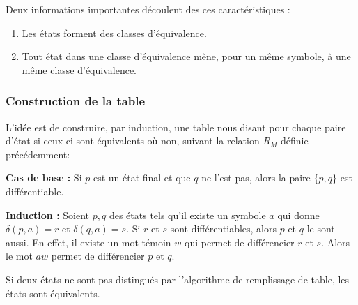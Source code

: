 Deux informations importantes découlent des ces caractéristiques : 
\begin{enumerate}
	\item Les états forment des classes d'équivalence.
	\item Tout état dans une classe d'équivalence mène, pour un même symbole, à une même classe d'équivalence.
\end{enumerate}

\subsubsection{Construction de la table}

L'idée est de construire, par induction, une table nous disant pour chaque paire d'état si ceux-ci sont équivalents où non, suivant la relation $R_M$ définie précédemment:

\textbf{Cas de base :} Si $p$ est un état final et que $q$ ne l'est pas, alors la paire $\{p,q\}$ est différentiable.

\textbf{Induction : } Soient $p,q$ des états tels qu'il existe un symbole $a$ qui donne $\delta(p,a)=r$ et $\delta(q,a)=s$. Si $r$ et $s$ sont différentiables, alors $p$ et $q$ le sont aussi. En effet, il existe un mot témoin $w$ qui permet de différencier $r$ et $s$. Alors le mot $aw$ permet de différencier $p$ et $q$.

\begin{theorem}
	Si deux états ne sont pas distingués par l'algorithme de remplissage de table, les états sont équivalents.
\end{theorem}

